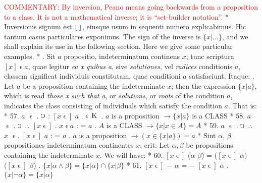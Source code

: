 \documentclass{book}
\newcommand{\C}{\mathop{\sbox0{$\displaystyle$$\reflectbox{C}$} %
\raisebox{-\height+\ht0-0.05cm}[\ht0][\dp0]{\scalebox{0.8}[0.8]{\copy0}}}\displaylimits} %
\newcommand{\pppNoSpace}{\leavevmode\lower0ex\hbox{.}\kern-0.1em\raise0.7ex\hbox{.}\kern-0.1em\lower0ex\hbox{.}} %
\newcommand{\smallIn}{\ensuremath{\mathrel{\epsilon}}}
\newcommand{\K}{\mathop{\thinspace \text{K} \thinspace}}
\newcommand\commentary[1]{\textcolor{red}{COMMENTARY: #1}}
\newenvironment{translateTwoCol}
               { %
                 \columnratio{0.5, 0.5} \begin{paracol}{2}
                 \newcommand{\LAT}{\switchcolumn[0]*}
                 \newcommand{\ENG}{\switchcolumn[1]}
               }
               { %
                 \let\ENG\undefined
                 \let\LAT\undefined
                 \end{paracol}
               }
\begin{document}
\begin{translateTwoCol}
\ENG
\commentary{By inversion, Peano means going backwards from a proposition to a class.  It is not a mathematical inverse; it is ``set-builder notation''. }
\LAT  
\quad Inversionis signum est $\scalebox{1.5}[0.8]{[\scalebox{0.2}{ \ }]}$, eiusque usum in sequenti numero explicabimus. Hic tantum casus particulares exponimus.
\ENG
\quad The sign of the inverse is $\{x | \ldots\}$, and we shall explain its use in the following section. Here we give some particular examples.
\LAT
{}. Sit $a$ propositio, indeterminatum continens $x$; tunc scriptura $[x] \smallIn a$, quae legitur \emph{ea x quibus a}, sive {\emph{solutiones}}, vel {\emph{radices}} conditionis $a$, classem significat individuis constitutam, quae conditioni $a$ satisfaciunt. Itaque:
\ENG
{}. Let $a$ be a proposition containing the indeterminate $x$; then the expression $\{ x | a \}$, which is read {\emph{those x such that a}}, or {\emph{solutions}}, or {\emph{roots}} of the condition $a$, indicates the class consisting of individuals which satisfy the condition $a$. That is:
\LAT
57. \hspace{0.67cm} $a$ \smallIn {} . $\C$ : $[x\smallIn]$ $a$ . $\smallIn \K$
\ENG
57. \hspace{0.67cm} $a$ is a \scriptsize{proposition} \normalsize $\rightarrow \{x | a \}$ is a \scriptsize{CLASS} \normalsize 
\LAT
58. \hspace{0.67cm} $a$ \smallIn {} . $\C$ $\pppNoSpace$ $[x\smallIn]$ . $x \smallIn a$ : = $a$
\ENG
58. \hspace{0.67cm} $A$ is a \scriptsize{CLASS} \normalsize $\rightarrow \{ x | x \in A \} = A $
\LAT
59. \hspace{0.67cm} $a$ \smallIn {} . $\C$ $\pppNoSpace$ $x$ \smallIn . $[x\smallIn]$ $a$ : = $a$
\ENG
59. \hspace{0.67cm}  $a$ is a \scriptsize{proposition} \normalsize $\rightarrow (x \in \{x | a \}) = a$
\LAT
\quad Sint $\alpha$, $\beta$ propositiones indeterminatum continentes $x$; erit:
\ENG
\quad Let $\alpha, \beta$ be propositions containing the indeterminate $x$. We will have:
\LAT
60. \hspace{0.67cm} $[x\smallIn]$ ($\alpha$ $\beta$) = ($[x\smallIn]$ $\alpha)$ $([x\smallIn]$ $\beta$)
\ENG
60. \hspace{0.67cm} $\{x | \alpha \wedge \beta\}=\{x|\alpha\} \cap \{x | \beta\}$
\LAT
61. \hspace{0.67cm} $[x\smallIn]$ $-$ $\alpha$ = $-$ $[x\smallIn]$ $\alpha$
\ENG
61. \hspace{0.67cm} $\{x | \neg \alpha \} = \overline{\{x | \alpha\}}$

\end{translateTwoCol}
\end{document}
